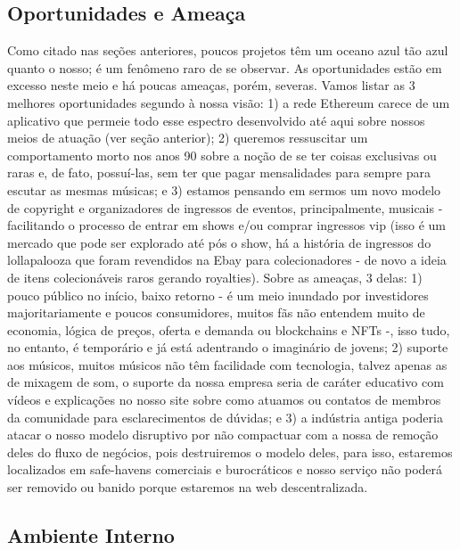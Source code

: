\documentclass[onecolumn,12pt]{asme2ej}
\begin{document}
\subsection{Oportunidades e Ameaça}

Como citado nas seções anteriores, poucos projetos têm um oceano azul tão azul quanto o nosso; é um fenômeno raro de se observar. As oportunidades estão em excesso neste meio e há poucas ameaças, porém, severas. Vamos listar as 3 melhores oportunidades segundo à nossa visão: 1) a rede Ethereum carece de um aplicativo que permeie todo esse espectro desenvolvido até aqui sobre nossos meios de atuação (ver seção anterior); 2) queremos ressuscitar um comportamento morto nos anos 90 sobre a noção de se ter coisas exclusivas ou raras e, de fato, possuí-las, sem ter que pagar mensalidades para sempre para escutar as mesmas músicas; e 3) estamos pensando em sermos um novo modelo de copyright e organizadores de ingressos de eventos, principalmente, musicais - facilitando o processo de entrar em shows e/ou comprar ingressos vip (isso é um mercado que pode ser explorado até pós o show, há a história de ingressos do lollapalooza que foram revendidos na Ebay para colecionadores - de novo a ideia de itens colecionáveis raros gerando royalties). Sobre as ameaças, 3 delas: 1) pouco público no início, baixo retorno - é um meio inundado por investidores majoritariamente e poucos consumidores, muitos fãs não entendem muito de economia, lógica de preços, oferta e demanda ou blockchains e NFTs -, isso tudo, no entanto, é temporário e já está adentrando o imaginário de jovens; 2) suporte aos músicos, muitos músicos não têm facilidade com tecnologia, talvez apenas as de mixagem de som, o suporte da nossa empresa seria de caráter educativo com vídeos e explicações no nosso site sobre como atuamos ou contatos de membros da comunidade para esclarecimentos de dúvidas; e 3) a indústria antiga poderia atacar o nosso modelo disruptivo por não compactuar com a nossa de remoção deles do fluxo de negócios, pois destruiremos o modelo deles, para isso, estaremos localizados em safe-havens comerciais e burocráticos e nosso serviço não poderá ser removido ou banido porque estaremos na web descentralizada. 

\subsection{Ambiente Interno}

\end{document}
